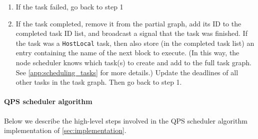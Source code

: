 \begin{enumerate}
    \item If the task failed, go back to step 1
    \item If the task completed, remove it from the partial graph, add its ID to the completed task ID list, and broadcast a signal that the task was finished. If the task was a \texttt{HostLocal} task, then also store (in the completed task list) an entry containing the name of the next block to execute. (In this way, the node scheduler knows which task(s) to create and add to the full task graph. See \cref{app:scheduling_tasks} for more details.)
    Update the deadlines of all other tasks in the task graph.
    Then go back to step 1.
\end{enumerate}

\paragraph{QPS scheduler algorithm}
Below we describe the high-level steps involved in the QPS scheduler algorithm implementation of \cref{sec:implementation}.
